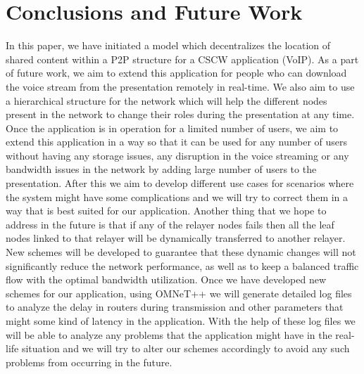 \section{Conclusions and Future Work}
In this paper, we have initiated a model which decentralizes the location of
shared content within a P2P structure for a CSCW application (VoIP).
As a part of future work, we aim to extend this application for people who can
download the voice stream from the presentation remotely in real-time. We also
aim to use a hierarchical structure for the network which will help the
different nodes present in the network to change their roles during the
presentation at any time. Once the application is in operation for a limited
number of users, we aim to extend this application in a way so that it
can be used for any number of users without having any storage issues, any
disruption in the voice streaming or any bandwidth issues in the network by
adding large number of users to the presentation. After this we aim to develop 
different use cases for scenarios where the system might have some complications 
and we will try to correct them in a way that is best suited for our application. 
Another thing that we hope to address in the future is that if any of the relayer nodes fails then all
the leaf nodes linked to that relayer will be dynamically transferred to
another relayer. New schemes will be developed to guarantee that these dynamic
changes will not significantly reduce the network performance, as well as to
keep a balanced traffic flow with the optimal bandwidth utilization. Once we have developed 
new schemes for our application, using OMNeT++ we will generate detailed log files 
to analyze the delay in routers during transmission and other parameters that might 
some kind of latency in the application. With the help of these log files we will be able 
to analyze any problems that the application might have in the real-life situation and 
we will try to alter our schemes accordingly to avoid any such problems from occurring in the future. 